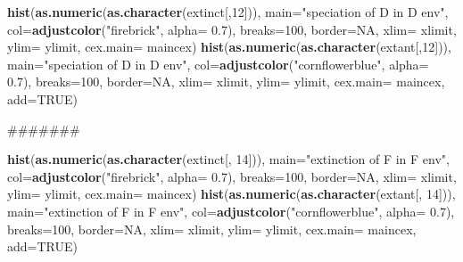 \documentclass[]{book}
\newenvironment{Shaded}{\begin{snugshade}}{\end{snugshade}}
\newcommand{\KeywordTok}[1]{\textcolor[rgb]{0.13,0.29,0.53}{\textbf{{#1}}}}
\newcommand{\DataTypeTok}[1]{\textcolor[rgb]{0.13,0.29,0.53}{{#1}}}
\newcommand{\DecValTok}[1]{\textcolor[rgb]{0.00,0.00,0.81}{{#1}}}
\newcommand{\FloatTok}[1]{\textcolor[rgb]{0.00,0.00,0.81}{{#1}}}
\newcommand{\StringTok}[1]{\textcolor[rgb]{0.31,0.60,0.02}{{#1}}}
\newcommand{\OtherTok}[1]{\textcolor[rgb]{0.56,0.35,0.01}{{#1}}}
\newcommand{\NormalTok}[1]{{#1}}
\theoremstyle{definition}
\theoremstyle{definition}
\theoremstyle{remark}
\begin{document}
\begin{Shaded}
\begin{Highlighting}[]
\KeywordTok{hist}\NormalTok{(}\KeywordTok{as.numeric}\NormalTok{(}\KeywordTok{as.character}\NormalTok{(extinct[,}\DecValTok{12}\NormalTok{])), }\DataTypeTok{main=}\StringTok{"speciation of D in D env"}\NormalTok{, }\DataTypeTok{col=}\KeywordTok{adjustcolor}\NormalTok{(}\StringTok{"firebrick"}\NormalTok{, }\DataTypeTok{alpha=} \FloatTok{0.7}\NormalTok{), }\DataTypeTok{breaks=}\DecValTok{100}\NormalTok{, }\DataTypeTok{border=}\OtherTok{NA}\NormalTok{, }\DataTypeTok{xlim=}\NormalTok{ xlimit, }\DataTypeTok{ylim=}\NormalTok{ ylimit, }\DataTypeTok{cex.main=}\NormalTok{ maincex)}
\KeywordTok{hist}\NormalTok{(}\KeywordTok{as.numeric}\NormalTok{(}\KeywordTok{as.character}\NormalTok{(extant[,}\DecValTok{12}\NormalTok{])), }\DataTypeTok{main=}\StringTok{"speciation of D in D env"}\NormalTok{, }\DataTypeTok{col=}\KeywordTok{adjustcolor}\NormalTok{(}\StringTok{"cornflowerblue"}\NormalTok{, }\DataTypeTok{alpha=} \FloatTok{0.7}\NormalTok{), }\DataTypeTok{breaks=}\DecValTok{100}\NormalTok{, }\DataTypeTok{border=}\OtherTok{NA}\NormalTok{, }\DataTypeTok{xlim=}\NormalTok{ xlimit, }\DataTypeTok{ylim=}\NormalTok{ ylimit, }\DataTypeTok{cex.main=}\NormalTok{ maincex, }\DataTypeTok{add=}\OtherTok{TRUE}\NormalTok{)}

\NormalTok{#######}

\KeywordTok{hist}\NormalTok{(}\KeywordTok{as.numeric}\NormalTok{(}\KeywordTok{as.character}\NormalTok{(extinct[, }\DecValTok{14}\NormalTok{])), }\DataTypeTok{main=}\StringTok{"extinction of F in F env"}\NormalTok{, }\DataTypeTok{col=}\KeywordTok{adjustcolor}\NormalTok{(}\StringTok{"firebrick"}\NormalTok{, }\DataTypeTok{alpha=} \FloatTok{0.7}\NormalTok{), }\DataTypeTok{breaks=}\DecValTok{100}\NormalTok{, }\DataTypeTok{border=}\OtherTok{NA}\NormalTok{, }\DataTypeTok{xlim=}\NormalTok{ xlimit, }\DataTypeTok{ylim=}\NormalTok{ ylimit, }\DataTypeTok{cex.main=}\NormalTok{ maincex)}
\KeywordTok{hist}\NormalTok{(}\KeywordTok{as.numeric}\NormalTok{(}\KeywordTok{as.character}\NormalTok{(extant[, }\DecValTok{14}\NormalTok{])), }\DataTypeTok{main=}\StringTok{"extinction of F in F env"}\NormalTok{, }\DataTypeTok{col=}\KeywordTok{adjustcolor}\NormalTok{(}\StringTok{"cornflowerblue"}\NormalTok{, }\DataTypeTok{alpha=} \FloatTok{0.7}\NormalTok{), }\DataTypeTok{breaks=}\DecValTok{100}\NormalTok{, }\DataTypeTok{border=}\OtherTok{NA}\NormalTok{, }\DataTypeTok{xlim=}\NormalTok{ xlimit, }\DataTypeTok{ylim=}\NormalTok{ ylimit, }\DataTypeTok{cex.main=}\NormalTok{ maincex, }\DataTypeTok{add=}\OtherTok{TRUE}\NormalTok{)}




\end{Highlighting}
\end{Shaded}
\end{document}
